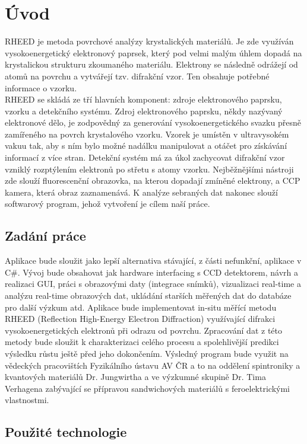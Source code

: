 \documentclass{article}
\begin{document}
\section{Úvod}
    RHEED je metoda povrchové analýzy krystalických materiálů. Je zde využíván vysokoenergetický elektronový paprsek, který pod velmi malým úhlem dopadá na krystalickou strukturu zkoumaného materiálu. Elektrony se následně odrážejí od atomů na povrchu a vytvářejí tzv. difrakční vzor. Ten obsahuje potřebné informace o vzorku.\\

    RHEED se skládá ze tří hlavních komponent: zdroje elektronového paprsku, vzorku a detekčního systému. Zdroj elektronového paprsku, někdy nazývaný elektronové dělo, je zodpovědný za generování vysokoenergetického svazku přesně zamířeného na povrch krystalového vzorku. Vzorek je umístěn v ultravysokém vakuu tak, aby s ním bylo možné nadálku manipulovat a otáčet pro získávání informací z více stran. Detekční systém má za úkol zachycovat difrakční vzor vzniklý rozptýlením elektronů po střetu s atomy vzorku. Nejběžnějšími nástroji zde slouží fluorescenční obrazovka, na kterou dopadají zmíněné elektrony, a CCP kamera, která obraz zaznamenává. K analýze sebraných dat nakonec slouží softwarový program, jehož vytvoření je cílem naší práce.
    
\subsection{Zadání práce}
    Aplikace bude sloužit jako lepší alternativa stávající, z části nefunkční, aplikace v C\#. Vývoj bude obsahovat jak hardware interfacing s CCD detektorem, návrh a realizaci GUI, práci s obrazovými daty (integrace snímků), vizualizaci real-time a analýzu real-time obrazových dat, ukládání starších měřených dat do databáze pro další výzkum atd. Aplikace bude implementovat in-situ měřící metodu RHEED (Reflection High-Energy Electron Diffraction) využívající difrakci vysokoenergetických elektronů při odrazu od povrchu. Zpracování dat z této metody bude sloužit k charakterizaci celého procesu a spolehlivější predikci výsledku růstu ještě před jeho dokončením. Výsledný program bude využit na vědeckých pracovištích Fyzikálního ústavu AV ČR a to na oddělení spintroniky a kvantových materiálů Dr. Jungwirtha a ve výzkumné skupině Dr. Tima Verhagena zabývající se přípravou sandwichových materiálů s feroelektrickými vlastnostmi.
\subsection{Použité technologie}
\end{document}
